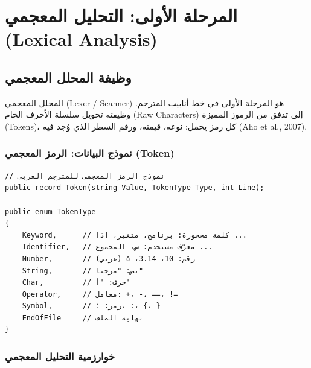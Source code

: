 \documentclass[12pt,a4paper]{report}
\newcommand{\filename}[1]{\textcolor{SecondaryBlue}{\texttt{#1}}}
\begin{document}
\chapter{المرحلة الأولى: التحليل المعجمي (Lexical Analysis)}

\section{وظيفة المحلل المعجمي}

المحلل المعجمي (Lexer / Scanner) هو المرحلة الأولى في خط أنابيب المترجم. وظيفته تحويل سلسلة الأحرف الخام (Raw Characters) إلى تدفق من الرموز المميزة (Tokens)، كل رمز يحمل: نوعه، قيمته، ورقم السطر الذي وُجد فيه (Aho et al., 2007).

\subsection{نموذج البيانات: الرمز المعجمي (Token)}

\begin{CodeBox}[title={\filename{Token.cs} — نموذج الرمز المعجمي}]
\begin{lstlisting}[style=CSharpStyle]
// نموذج الرمز المعجمي للمترجم العربي
public record Token(string Value, TokenType Type, int Line);

public enum TokenType
{
    Keyword,      // كلمة محجوزة: برنامج، متغير، اذا ...
    Identifier,   // معرّف مستخدم: س، المجموع ...
    Number,       // رقم: 10، 3.14، ٥ (عربي)
    String,       // نص: "مرحبا"
    Char,         // حرف: 'أ'
    Operator,     // معامل: +، -، ==، !=
    Symbol,       // رمز: ؛، :، {، }
    EndOfFile     // نهاية الملف
}
\end{lstlisting}
\end{CodeBox}

\subsection{خوارزمية التحليل المعجمي}
\end{document}
